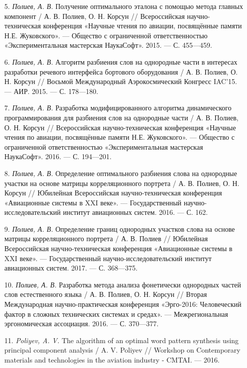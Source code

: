 \begin{enumerate}[wide, labelindent=0pt, leftmargin=*]
	\item[5.] \label{poliyev2015pca} \textit{Полиев, А. В.} Получение оптимального эталона с помощью метода главных компонент / А. В. Полиев, О. Н. Корсун // Всероссийская научно-техническая конференция «Научные чтения по авиации, посвящённые памяти Н.Е. Жуковского». — Общество с ограниченной ответственностью «Экспериментальная мастерская НаукаСофт». 2015. — С. 455—459.
	\item[6.] \label{poliyev2015split} \textit{Полиев, А. В.} Алгоритм разбиения слов на однородные части в интересах разработки речевого интерфейса бортового оборудования / А. В. Полиев, О. Н. Корсун // Восьмой Международный Аэрокосмический Конгресс IAC’15. — АИР. 2015. — С. 178—180.
	\item[7.] \label{poliyev2016dynamic} \textit{Полиев, А. В.} Разработка модифицированного алгоритма динамического программирования для разбиения слов на однородные части / А. В. Полиев, О. Н. Корсун // Всероссийская научно-техническая конференция «Научные чтения по авиации, посвящённые памяти Н.Е. Жуковского». — Общество с ограниченной ответственностью «Экспериментальная мастерская НаукаСофт». 2016. — С. 194—201.
	\item[8.] \label{poliyev2016split} \textit{Полиев, А. В.} Определение оптимального разбиения слова на однородные участки на основе матрицы корреляционного портрета / А. В. Полиев, О. Н. Корсун // Юбилейная Всероссийская научно-техническая конференция «Авиационные системы в XXI веке». — Государственный научно-исследовательский институт авиационных систем. 2016. — С. 162.
	\item[9.] \label{poliyev2017split} \textit{Полиев, А. В.} Определение границ однородных участков слова на основе матрицы корреляционного портрета / А. В. Полиев // Юбилейная Всероссийская научно-техническая конференция «Авиационные системы в XXI веке». — Государственный научно-исследовательский институт авиационных систем. 2017. — С. 368—375.
	\item[10.] \label{poliyev2016natural} \textit{Полиев, А. В.} Разработка метода анализа фонетически однородных частей слов естественного языка / А. В. Полиев, О. Н. Корсун // Вторая Международная научно-практическая конференция «Эрго-2016: Человеческий фактор в сложных технических системах и средах». — Межрегиональная эргономическая ассоциация. 2016. — С. 370—377.
	\item[11.] \label{poliyev2016pca} \textit{Poliyev, A. V.} The algorithm of an optimal word pattern synthesis using principal component analysis / A. V. Poliyev // Workshop on Contemporary materials and technologies in the aviation industry - CMTAI. –– 2016.

\end{enumerate}
